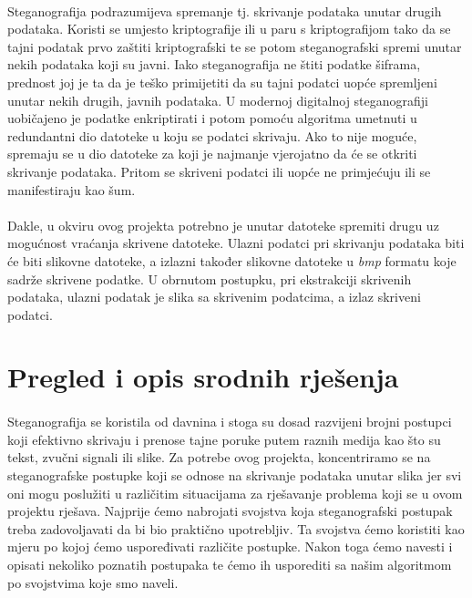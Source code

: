 \documentclass[times, utf8, seminar, numeric]{fer}
\begin{document}
\paragraph{}
Steganografija podrazumijeva spremanje tj. skrivanje podataka unutar drugih podataka. Koristi se umjesto kriptografije ili u paru s kriptografijom tako da se tajni podatak prvo zaštiti kriptografski te se potom steganografski spremi unutar nekih podataka koji su javni. Iako steganografija ne štiti podatke šiframa, prednost joj je ta da je teško primijetiti da su tajni podatci uopće spremljeni unutar nekih drugih, javnih podataka. U modernoj digitalnoj steganografiji uobičajeno je podatke enkriptirati i potom pomoću algoritma umetnuti u redundantni dio datoteke u koju se podatci skrivaju. Ako to nije moguće, spremaju se u dio datoteke za koji je najmanje vjerojatno da će se otkriti skrivanje podataka. Pritom se skriveni podatci ili uopće ne primjećuju ili se manifestiraju kao šum. 
\paragraph{}
Dakle, u okviru ovog projekta potrebno je unutar datoteke spremiti drugu uz mogućnost vraćanja skrivene datoteke. Ulazni podatci pri skrivanju podataka biti će biti slikovne datoteke, a izlazni također slikovne datoteke u \textit{bmp} formatu koje sadrže skrivene podatke. U obrnutom postupku, pri ekstrakciji skrivenih podataka, ulazni podatak je slika sa skrivenim podatcima, a izlaz skriveni podatci. 
\section{Pregled i opis srodnih rješenja}

\paragraph{}
Steganografija se koristila od davnina i stoga su dosad razvijeni brojni postupci koji efektivno skrivaju i prenose tajne poruke putem raznih medija kao što su tekst, zvučni signali ili slike. Za potrebe ovog projekta, koncentriramo se na steganografske postupke koji se odnose na skrivanje podataka unutar slika jer svi oni mogu poslužiti u različitim situacijama za rješavanje problema koji se u ovom projektu rješava. Najprije ćemo nabrojati svojstva koja steganografski postupak treba zadovoljavati da bi bio praktično upotrebljiv. Ta svojstva ćemo koristiti kao mjeru po kojoj ćemo uspoređivati različite postupke. Nakon toga ćemo navesti i opisati nekoliko poznatih postupaka te ćemo ih usporediti sa našim algoritmom po svojstvima koje smo naveli.
\end{document}
